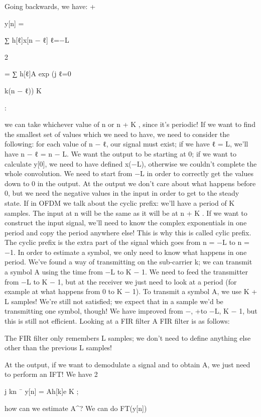 {Going backwards, we have:
+\infty

y[n] =

∑ h[ℓ]x[n − ℓ]
ℓ=−\infty L

2\pi

= ∑ h[ℓ]A exp (j ℓ=0

k(n − ℓ))
K

:

we can take whichever value of n or n + K , since it's periodic! If we want to find the smallest set of values which we need to have, we need to consider the following: for each value of n − ℓ, our signal must exist; if we have ℓ = L, we'll have n − ℓ = n − L. We want the output to be starting at 0; if we want to calculate y[0], we need to have defined x(−L), otherwise we couldn't complete the whole convolution. We need to start from −L in order to correctly get the values down to 0 in the output.
At the output we don't care about what happens before 0, but we need the negative values in the input in order to get to the steady state.
If in OFDM we talk about the cyclic prefix: we'll have a period of K samples. The input at n will be the same as it will be at n + K .
If we want to construct the input signal, we'll need to know the complex exponentials in one period and copy the period anywhere else!
This is why this is called cylic prefix.
The cyclic prefix is the extra part of the signal which goes from n = −L to n = −1.
In order to estimate a symbol, we only need to know what happens in one period.
We've found a way of transmitting on the sub-carrier k; we can transmit a symbol A using the time from −L to K − 1. We need to feed the transmitter from −L to K − 1, but at the receiver we just need to look at a period (for example at what happens from 0 to K − 1).
To transmit a symbol A, we use K + L samples!
We're still not satisfied; we expect that in a sample we'd be transmitting one symbol,
though! We have improved from −\infty, +\infty to −L, K − 1, but this is still not efficient.
Looking at a FIR filter A FIR filter is as follows:

The FIR filter only remembers L samples; we don't need to define anything else other than the previous L samples!

At the output, if we want to demodulate a signal and to obtain A, we just need to perform an IFT!
We have 2\pi

j kn
¯
y[n] = Ah[k]e K
;

how can we estimate A^? We can do FT(y[n])







}
